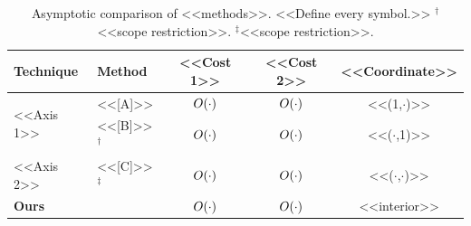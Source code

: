 \begin{table}[t]
\centering\scriptsize
\caption{Asymptotic comparison of <<methods>>. <<Define every symbol.>>
$^\dagger$<<scope restriction>>. $^\ddagger$<<scope restriction>>.}
\label{tab:related}
\renewcommand{\arraystretch}{0.92}\setlength{\tabcolsep}{3pt}
\begin{tabular}{llccc}
\toprule
Technique & Method & <<Cost 1>> & <<Cost 2>> & <<Coordinate>> \\
\midrule
\multirow{2}{*}{<<Axis 1>>} & <<[A]>> & $O(\cdot)$ & $O(\cdot)$ & <<(1,$\cdot$)>> \\
                            & <<[B]>>$^\dagger$ & $O(\cdot)$ & $O(\cdot)$ & <<($\cdot$,1)>> \\
\midrule
<<Axis 2>> & <<[C]>>$^\ddagger$ & $O(\cdot)$ & $O(\cdot)$ & <<($\cdot$,$\cdot$)>> \\
\midrule
\textbf{Ours} & & $O(\cdot)$ & $O(\cdot)$ & <<interior>> \\
\bottomrule
\end{tabular}
\end{table}
